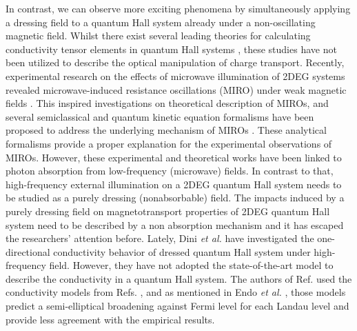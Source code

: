 \documentclass[
 reprint,
 amsmath,amssymb,
 aps,
 prb,
]{revtex4-2}
\begin{document}
In contrast, we can observe more exciting phenomena by simultaneously applying a dressing field to a quantum Hall system already under a non-oscillating magnetic field.
Whilst there exist several leading theories for calculating conductivity tensor elements in quantum Hall systems \cite{ando74_1,ando82,endo09}, these studies  have not been utilized to describe the optical manipulation of charge transport.
{\color{Red}Recently, experimental research on the effects of microwave illumination of 2DEG systems revealed microwave-induced resistance oscillations (MIRO) under weak magnetic fields \cite{zudov01,mani02,zudov03,mani04}.
This inspired investigations on theoretical description of MIROs, and several semiclassical and quantum kinetic equation formalisms have been proposed to address the underlying mechanism of MIROs \cite{durst03,dmitriev03,dmitriev05,dmitriev09}. These analytical formalisms provide a proper explanation for the experimental observations of MIROs. However, these experimental and theoretical works have been linked to photon absorption from low-frequency (microwave) fields.
In contrast to that, high-frequency external illumination on a 2DEG quantum Hall system needs to be studied as a purely dressing (nonabsorbable) field.
The impacts induced by a purely dressing field on magnetotransport properties of 2DEG quantum Hall system need to be described by a non absorption mechanism and it has escaped the researchers’ attention before.
Lately, Dini \textit{et al.} \cite{dini16} have investigated the one-directional conductivity behavior of dressed quantum Hall system under high-frequency field.} However, they have not adopted the state-of-the-art model to describe the conductivity in a quantum Hall system.
{\color{Red}The authors of Ref.\cite{dini16} used the conductivity models from Refs. \cite{ando74_1,ando82}, and as mentioned in Endo \textit{et al.} \cite{endo09}, those models predict a semi-elliptical broadening against Fermi level for each Landau level and provide less agreement with the empirical results.}
\end{document}

